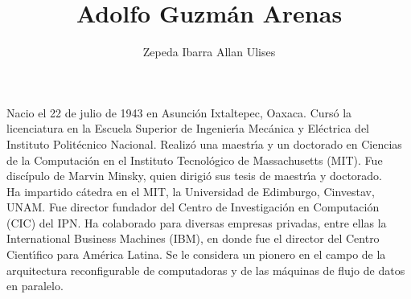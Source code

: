 \documentclass[a4paper,10pt]{article}
\title{Adolfo Guzm\'an Arenas}
\author{Zepeda Ibarra Allan Ulises}
\begin{document}
\maketitle

Nacio el 22 de julio de 1943 en Asunción Ixtaltepec, Oaxaca.
Curs\'o la licenciatura en la Escuela Superior de Ingenier\'{\i}a Mec\'anica y El\'ectrica del Instituto Polit\'ecnico Nacional. 
Realiz\'o una maestr\'{\i}a y un doctorado en Ciencias de la Computaci\'on en el Instituto Tecnol\'ogico de Massachusetts (MIT). 
Fue discípulo de Marvin Minsky, quien dirigi\'o sus tesis de maestr\'{\i}a y doctorado.
\\
Ha impartido c\'atedra en el  MIT, la Universidad de Edimburgo, Cinvestav, UNAM. Fue director fundador del Centro de Investigaci\'on en Computaci\'on (CIC) del IPN.
Ha colaborado para diversas empresas privadas, entre ellas la International Business Machines (IBM), en donde fue el director del Centro Cient\'{\i}fico para Am\'erica Latina.
Se le considera un pionero en el campo de la arquitectura reconfigurable de computadoras y de las m\'aquinas de flujo de datos en paralelo.
\end{document}
